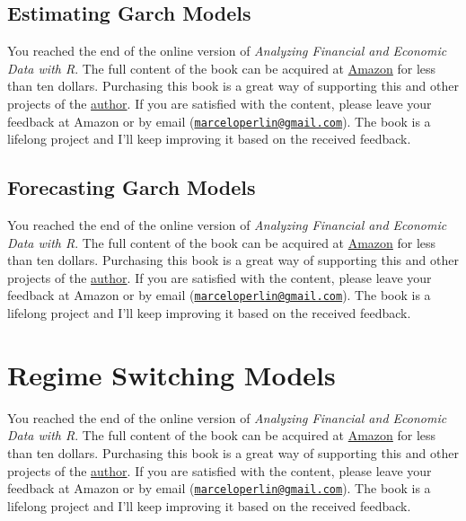 \documentclass[
  12pt,
]{book}
\newenvironment{pleasebuyit}
{\begin{noteblock}
		
	} {\end{noteblock}}
\begin{document}
\hypertarget{estimating-garch}{%
\subsection{Estimating Garch Models}\label{estimating-garch}}

\begin{pleasebuyit}
You reached the end of the online version of \emph{Analyzing Financial
and Economic Data with R}. The full content of the book can be acquired
at \href{https://www.amazon.com/dp/B084LSNXMN}{Amazon} for less than ten
dollars. Purchasing this book is a great way of supporting this and
other projects of the \href{https://www.msperlin.com/blog/}{author}. If
you are satisfied with the content, please leave your feedback at Amazon
or by email
(\href{mailto:marceloperlin@gmail.com}{\nolinkurl{marceloperlin@gmail.com}}).
The book is a lifelong project and I'll keep improving it based on the
received feedback.
\end{pleasebuyit}

\hypertarget{forecasting-garch-models}{%
\subsection{Forecasting Garch Models}\label{forecasting-garch-models}}

\begin{pleasebuyit}
You reached the end of the online version of \emph{Analyzing Financial
and Economic Data with R}. The full content of the book can be acquired
at \href{https://www.amazon.com/dp/B084LSNXMN}{Amazon} for less than ten
dollars. Purchasing this book is a great way of supporting this and
other projects of the \href{https://www.msperlin.com/blog/}{author}. If
you are satisfied with the content, please leave your feedback at Amazon
or by email
(\href{mailto:marceloperlin@gmail.com}{\nolinkurl{marceloperlin@gmail.com}}).
The book is a lifelong project and I'll keep improving it based on the
received feedback.
\end{pleasebuyit}

\hypertarget{regime-switching-models}{%
\section{Regime Switching Models}\label{regime-switching-models}}

\begin{pleasebuyit}
You reached the end of the online version of \emph{Analyzing Financial
and Economic Data with R}. The full content of the book can be acquired
at \href{https://www.amazon.com/dp/B084LSNXMN}{Amazon} for less than ten
dollars. Purchasing this book is a great way of supporting this and
other projects of the \href{https://www.msperlin.com/blog/}{author}. If
you are satisfied with the content, please leave your feedback at Amazon
or by email
(\href{mailto:marceloperlin@gmail.com}{\nolinkurl{marceloperlin@gmail.com}}).
The book is a lifelong project and I'll keep improving it based on the
received feedback.
\end{pleasebuyit}
\end{document}
